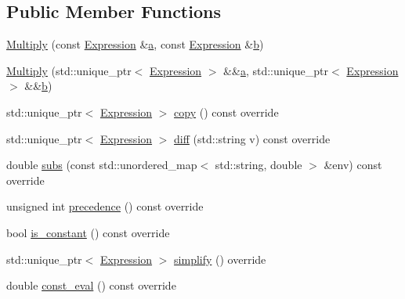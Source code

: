 \subsection*{Public Member Functions}
\begin{DoxyCompactItemize}
\item 
\mbox{\hyperlink{classsymcpp_1_1Multiply_abe8b88c2ac3ecd7deb275b1cb1f5dd9d}{Multiply}} (const \mbox{\hyperlink{classsymcpp_1_1Expression}{Expression}} \&\mbox{\hyperlink{classsymcpp_1_1Multiply_a8ed32ccb235cea51161dd0fd25ea130d}{a}}, const \mbox{\hyperlink{classsymcpp_1_1Expression}{Expression}} \&\mbox{\hyperlink{classsymcpp_1_1Multiply_a3d7a1b6e6e35585098b25f8b3a59e6ae}{b}})
\item 
\mbox{\hyperlink{classsymcpp_1_1Multiply_abefbdc2703e4c56207fe9aa987097fe6}{Multiply}} (std\+::unique\+\_\+ptr$<$ \mbox{\hyperlink{classsymcpp_1_1Expression}{Expression}} $>$ \&\&\mbox{\hyperlink{classsymcpp_1_1Multiply_a8ed32ccb235cea51161dd0fd25ea130d}{a}}, std\+::unique\+\_\+ptr$<$ \mbox{\hyperlink{classsymcpp_1_1Expression}{Expression}} $>$ \&\&\mbox{\hyperlink{classsymcpp_1_1Multiply_a3d7a1b6e6e35585098b25f8b3a59e6ae}{b}})
\item 
std\+::unique\+\_\+ptr$<$ \mbox{\hyperlink{classsymcpp_1_1Expression}{Expression}} $>$ \mbox{\hyperlink{classsymcpp_1_1Multiply_adcd57ab1c1a27eb10aeeb572cdd14e5e}{copy}} () const override
\item 
std\+::unique\+\_\+ptr$<$ \mbox{\hyperlink{classsymcpp_1_1Expression}{Expression}} $>$ \mbox{\hyperlink{classsymcpp_1_1Multiply_a835e55ada54a6c1eeb6d02ceeef83198}{diff}} (std\+::string v) const override
\item 
double \mbox{\hyperlink{classsymcpp_1_1Multiply_a83a9396b931cd5010630f48ecd1bc2a1}{subs}} (const std\+::unordered\+\_\+map$<$ std\+::string, double $>$ \&env) const override
\item 
unsigned int \mbox{\hyperlink{classsymcpp_1_1Multiply_afd9f779b82aa2d7a3be63e7b8b0e8eb1}{precedence}} () const override
\item 
bool \mbox{\hyperlink{classsymcpp_1_1Multiply_a771fc25f8bafd49600c31db11dd72256}{is\+\_\+constant}} () const override
\item 
std\+::unique\+\_\+ptr$<$ \mbox{\hyperlink{classsymcpp_1_1Expression}{Expression}} $>$ \mbox{\hyperlink{classsymcpp_1_1Multiply_aff728e2edaa447f154918079b4e35a7e}{simplify}} () override
\item 
double \mbox{\hyperlink{classsymcpp_1_1Multiply_a1d9b8023ab0bf35c011eb7f3ee8d4c32}{const\+\_\+eval}} () const override
\end{DoxyCompactItemize}
